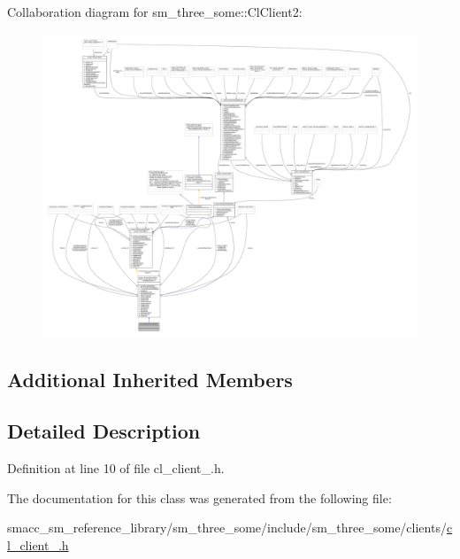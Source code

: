 Collaboration diagram for sm\+\_\+three\+\_\+some\+:\+:Cl\+Client2\+:
\nopagebreak
\begin{figure}[H]
\begin{center}
\leavevmode
\includegraphics[width=350pt]{classsm__three__some_1_1ClClient2__coll__graph}
\end{center}
\end{figure}
\subsection*{Additional Inherited Members}


\subsection{Detailed Description}


Definition at line 10 of file cl\+\_\+client\+\_.\+h.



The documentation for this class was generated from the following file\+:\begin{DoxyCompactItemize}
\item 
smacc\+\_\+sm\+\_\+reference\+\_\+library/sm\+\_\+three\+\_\+some/include/sm\+\_\+three\+\_\+some/clients/\hyperlink{cl__client__2_8h}{cl\+\_\+client\+\_.\+h}\end{DoxyCompactItemize}
